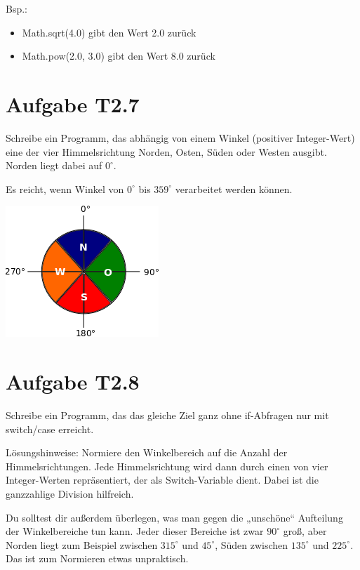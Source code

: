 \documentclass[final,a4paper]{article}
\begin{document}
Bsp.: 
\begin{itemize}
\item Math.sqrt(4.0) gibt den Wert 2.0 zurück
\item Math.pow(2.0, 3.0) gibt den Wert 8.0 zurück
\end{itemize}

\clearpage
\section*{Aufgabe T2.7}
Schreibe ein Programm, das abhängig von einem Winkel (positiver Integer-Wert) eine der vier Himmelsrichtung Norden, Osten, Süden oder Westen ausgibt. Norden liegt dabei auf \(0^\circ\). 

Es reicht, wenn Winkel von \(0^\circ\) bis \(359^\circ\) verarbeitet werden können.


\includegraphics{aufgabe_2_7_kompass.png}

\section*{Aufgabe T2.8}
Schreibe ein Programm, das das gleiche Ziel ganz ohne if-Abfragen nur mit switch/case erreicht.

Lösungshinweise: Normiere den Winkelbereich auf die Anzahl der Himmelsrichtungen. Jede Himmelsrichtung wird dann durch einen von vier Integer-Werten repräsentiert, der als Switch-Variable dient. Dabei ist die ganzzahlige Division hilfreich.

Du solltest dir außerdem überlegen, was man gegen die „unschöne“ Aufteilung der Winkelbereiche tun kann. Jeder dieser Bereiche ist zwar \(90^\circ\) groß, aber Norden liegt zum Beispiel zwischen \(315^\circ\) und \(45^\circ\), Süden zwischen \(135^\circ\) und \(225^\circ\). Das ist zum Normieren etwas unpraktisch.
\end{document}
